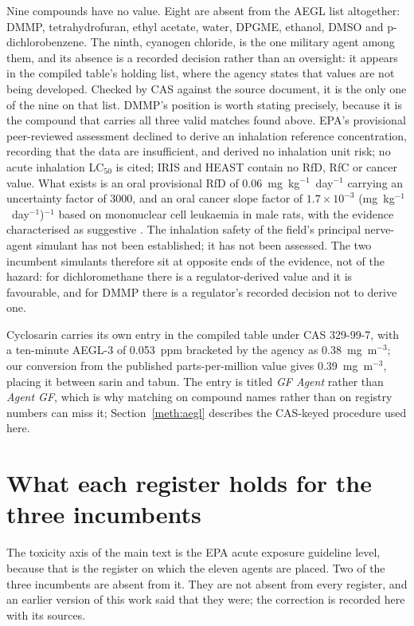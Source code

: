 \documentclass[journal=jacsat,manuscript=suppinfo,margin=1in]{achemso}
\begin{document}
Nine compounds have no value. Eight are absent from the AEGL list altogether:
DMMP, tetrahydrofuran, ethyl acetate, water, DPGME, ethanol, DMSO and
p-dichlorobenzene. The ninth, cyanogen chloride, is the one military agent
among them, and its absence is a recorded decision rather than an oversight: it
appears in the compiled table's holding list, where the agency states that
values are not being developed. Checked by CAS against the source document, it
is the only one of the nine on that list. DMMP's position is worth stating
precisely, because it is the compound
that carries all three valid matches found above. EPA's provisional
peer-reviewed assessment declined to derive an inhalation reference
concentration, recording that the data are insufficient, and derived no
inhalation unit risk; no acute inhalation LC$_{50}$ is cited; IRIS and HEAST
contain no RfD, RfC or cancer value. What exists is an oral provisional RfD of
0.06~mg~kg$^{-1}$~day$^{-1}$ carrying an uncertainty factor of 3000, and an oral
cancer slope factor of $1.7\times10^{-3}$ (mg~kg$^{-1}$~day$^{-1}$)$^{-1}$ based
on mononuclear cell leukaemia in male rats, with the evidence characterised as
suggestive \cite{epapprtv2006}. The inhalation safety of the field's principal
nerve-agent simulant has not been established; it has not been assessed. The two
incumbent simulants therefore sit at opposite ends of the evidence, not of the
hazard: for dichloromethane there is a regulator-derived value and it is
favourable, and for DMMP there is a regulator's recorded decision not to derive
one.

Cyclosarin carries its own entry in the compiled table under CAS 329-99-7, with
a ten-minute AEGL-3 of 0.053~ppm bracketed by the agency as 0.38~mg~m$^{-3}$;
our conversion from the published parts-per-million value gives
0.39~mg~m$^{-3}$, placing it between sarin and tabun. The entry is titled
\textit{GF Agent} rather than \textit{Agent GF}, which is why matching on
compound names rather than on registry numbers can miss it;
Section~\ref{meth:aegl} describes the CAS-keyed procedure used here.

\section{What each register holds for the three incumbents}
\label{res:registers}

The toxicity axis of the main text is the EPA acute exposure guideline level,
because that is the register on which the eleven agents are placed. Two of the
three incumbents are absent from it. They are not absent from every register,
and an earlier version of this work said that they were; the correction is
recorded here with its sources.
\end{document}
